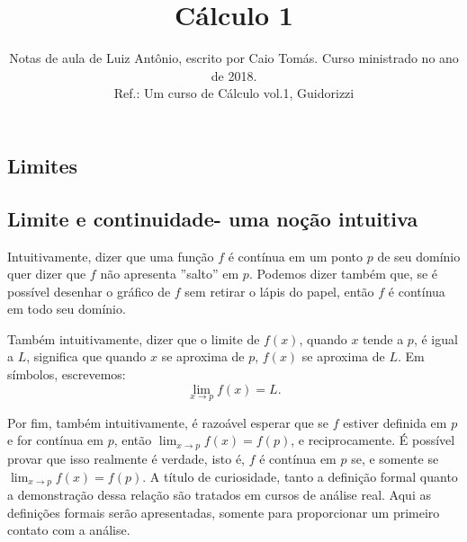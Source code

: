 \documentclass{article}
\title{\textbf{Cálculo 1}}
\author{Notas de aula de Luiz Antônio, escrito por Caio Tomás. Curso ministrado no ano de 2018.\\ Ref.: Um curso de Cálculo vol.1, Guidorizzi}
\date{}
\begin{document}
{\selectfont
\begin{titlepage}
\clearpage \maketitle \thispagestyle{empty}
\end{titlepage}

\clearpage \tableofcontents \thispagestyle{empty}

\begin{newpage}
\section{Limites}
\subsection{Limite e continuidade- uma noção intuitiva}
\hspace{12pt} Intuitivamente, dizer que uma função $f$ é contínua em um ponto $p$ de seu domínio quer dizer que $f$ não apresenta ''salto'' em $p$. Podemos dizer também que, se é possível desenhar o gráfico de $f$ sem retirar o lápis do papel, então $f$ é contínua em todo seu domínio.
\par Também intuitivamente, dizer que o limite de $f(x)$, quando $x$ tende a $p$, é igual a $L$, significa que quando $x$ se aproxima de $p$, $f(x)$ se aproxima de $L$. Em símbolos, escrevemos:
\begin{equation*}\displaystyle{\lim_{x\to p}f(x) = L}.\end{equation*}
\par Por fim, também intuitivamente, é razoável esperar que se $f$ estiver definida em $p$ e for contínua em $p$, então $\displaystyle{\lim_{x\to p}f(x) = f(p)}$, e reciprocamente. É possível provar que isso realmente é verdade, isto é, $f$ é contínua em $p$ se, e somente se $\displaystyle{\lim_{x\to p}f(x) = f(p)}$. A título de curiosidade, tanto a definição formal quanto a demonstração dessa relação são tratados em cursos de análise real. Aqui as definições formais serão apresentadas, somente para proporcionar um primeiro contato com a análise.
\par
\vspace{0.3cm}  

\end{newpage}}
\end{document}
